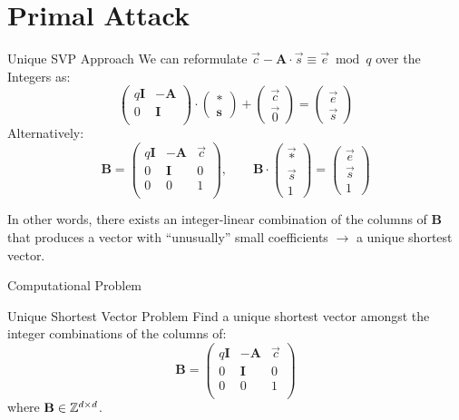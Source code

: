 \documentclass[xcolor=table,10pt,aspectratio=169]{beamer}
\begin{document}
\section{Primal Attack}
\label{sec:orge3deaa9}
\begin{frame}[label={sec:org1ff70a7}]{Unique SVP Approach}
We can reformulate \(\vec{c} - \mathbf{A} \cdot \vec{s} \equiv \vec{e} \bmod q\)  over the Integers as:
\[
  \begin{pmatrix}
    q\mathbf{I} & -\mathbf{A}\\
    0 & \mathbf{I}\\
  \end{pmatrix} \cdot
  \begin{pmatrix}
    \mathbf{*}\\
    \mathbf{s}
  \end{pmatrix} +
  \begin{pmatrix}
    \vec{c}\\
    \vec{0}
  \end{pmatrix} = 
  \begin{pmatrix}
    \vec{e}\\
    \vec{s}
  \end{pmatrix}
\]
Alternatively:
\[
  \mathbf{B} = \begin{pmatrix}
    q\mathbf{I} & -\mathbf{A} & \vec{c}\\
    0 & \mathbf{I} & 0\\
    0 & 0 & 1\\
  \end{pmatrix}, \qquad
  \mathbf{B} \cdot
  \begin{pmatrix}
    \vec{*}\\
    \vec{s}\\
    1
  \end{pmatrix} = 
  \begin{pmatrix}
    \vec{e}\\
    \vec{s}\\
    1
  \end{pmatrix}
\]

In other words, there exists an integer-linear combination of the columns of \(\mathbf{B}\) that produces a vector with “unusually” small coefficients \(\rightarrow\) a unique shortest vector.
\end{frame}

\begin{frame}[label={sec:orga9725b3}]{Computational Problem}
\begin{block}{Unique Shortest Vector Problem}
Find a unique shortest vector amongst the integer combinations of the columns of:
\[
  \mathbf{B} = \begin{pmatrix}
    q\mathbf{I} & -\mathbf{A} & \vec{c}\\
    0 & \mathbf{I} & 0\\
    0 & 0 & 1\\
  \end{pmatrix}
\]
where \(\mathbf{B} \in \mathbb{Z}^{d \times d}\).
\end{block}
\end{frame}
\end{document}
